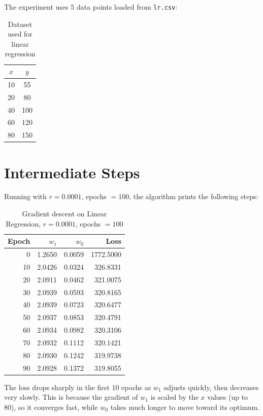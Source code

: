\documentclass[12pt,a4paper]{article}
\begin{document}
The experiment uses 5 data points loaded from \texttt{lr.csv}:

\begin{table}[H]
\centering
\caption{Dataset used for linear regression}
\begin{tabular}{cc}
\toprule
$x$ & $y$ \\
\midrule
10 & 55  \\
20 & 80  \\
40 & 100 \\
60 & 120 \\
80 & 150 \\
\bottomrule
\end{tabular}
\end{table}

\section{Intermediate Steps}

Running with $r = 0.0001$, epochs $= 100$, the algorithm prints the following steps:

\begin{table}[H]
\centering
\caption{Gradient descent on Linear Regression, $r = 0.0001$, epochs $= 100$}
\begin{tabular}{rrrr}
\toprule
\textbf{Epoch} & $w_1$ & $w_0$ & Loss \\
\midrule
0  & 1.2650 & 0.0059 & 1772.5000 \\
10 & 2.0426 & 0.0324 &  326.8331 \\
20 & 2.0911 & 0.0462 &  321.0075 \\
30 & 2.0939 & 0.0593 &  320.8165 \\
40 & 2.0939 & 0.0723 &  320.6477 \\
50 & 2.0937 & 0.0853 &  320.4791 \\
60 & 2.0934 & 0.0982 &  320.3106 \\
70 & 2.0932 & 0.1112 &  320.1421 \\
80 & 2.0930 & 0.1242 &  319.9738 \\
90 & 2.0928 & 0.1372 &  319.8055 \\
\bottomrule
\end{tabular}
\end{table}

The loss drops sharply in the first 10 epochs as $w_1$ adjusts quickly, then decreases very slowly. This is because the gradient of $w_1$ is scaled by the $x$ values (up to 80), so it converges fast, while $w_0$ takes much longer to move toward its optimum.
\end{document}
